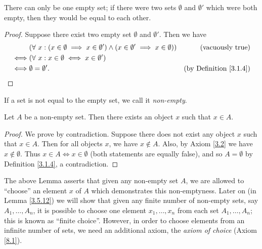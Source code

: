 \begin{additional corollary}\label{ac 3.1.2}
There can only be one empty set;
if there were two sets \(\emptyset\) and \(\emptyset'\) which were both empty, then they would be equal to each other.
\end{additional corollary}

\begin{proof}
Suppose there exist two empty set \(\emptyset\) and \(\emptyset'\).
Then we have
\begin{align*}
& (\forall\ x : (x \in \emptyset \implies x \in \emptyset') \land (x \in \emptyset' \implies x \in \emptyset)) & \text{(vacuously true)} \\
\iff & (\forall\ x : x \in \emptyset \iff x \in \emptyset') \\
\iff & \emptyset = \emptyset'. & \text{(by Definition \ref{3.1.4})}
\end{align*}
\end{proof}

\begin{note}
If a set is not equal to the empty set, we call it \emph{non-empty}.
\end{note}

\setcounter{theorem}{5}
\begin{lemma}\label{3.1.6}
Let \(A\) be a non-empty set.
Then there exists an object \(x\) such that \(x \in A\).
\end{lemma}

\begin{proof}
We prove by contradiction.
Suppose there does not exist any object \(x\) such that \(x \in A\).
Then for all objects \(x\), we have \(x \notin A\).
Also, by Axiom \ref{3.2} we have \(x \notin \emptyset\).
Thus \(x \in A \iff x \in \emptyset\) (both statements are equally false), and so \(A = \emptyset\) by Definition \ref{3.1.4}, a contradiction.
\end{proof}

\begin{remark}\label{3.1.7}
The above Lemma asserts that given any non-empty set \(A\), we are allowed to ``choose'' an element \(x\) of \(A\) which demonstrates this non-emptyness.
Later on (in Lemma \ref{3.5.12}) we will show that given any finite number of non-empty sets, say \(A_1, \dots, A_n\), it is possible to choose one element \(x_1, \dots, x_n\) from each set \(A_1, \dots, A_n\);
this is known as ``finite choice''.
However, in order to choose elements from an infinite number of sets, we need an additional axiom, the \emph{axiom of choice} (Axiom \ref{8.1}).
\end{remark}

